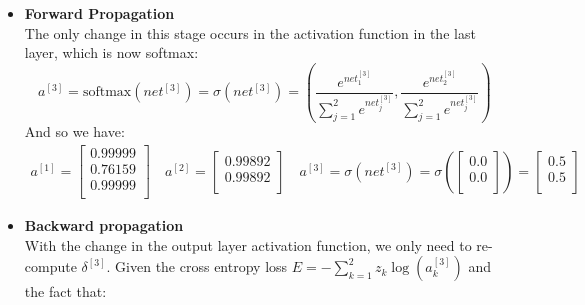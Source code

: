 \documentclass{exam}
\begin{document}
\begin{questions}
            \begin{itemize}
                \item \textbf{Forward Propagation} \\[0.4em]
                The only change in this stage occurs in the activation function in the last layer, which is now softmax:
                \begin{equation*}
                    a^{[3]} = \text{softmax}(net^{[3]}) = \sigma(net^{[3]}) = \left(\frac{e^{net^{[3]}_1}}{\sum_{j = 1}^{2}e^{net^{[3]}_j}},\frac{e^{net^{[3]}_2}}{\sum_{j = 1}^{2}e^{net^{[3]}_j}}\right)
                \end{equation*}  
                And so we have:
                \begin{align*}
                    a^{[1]} = 
                    \begin{bmatrix}
                        0.99999  \\
                        0.76159  \\
                        0.99999  \\
                    \end{bmatrix} \quad 
                    a^{[2]} = 
                    \begin{bmatrix}
                        0.99892  \\
                        0.99892  \\   
                    \end{bmatrix} \quad 
                    a^{[3]} = \sigma(net^{[3]}) = \sigma\left(
                    \begin{bmatrix}
                        0.0  \\
                        0.0  \\
                    \end{bmatrix} \right) =
                    \begin{bmatrix}
                        0.5  \\
                        0.5  \\
                    \end{bmatrix}
                \end{align*}     
                \item \textbf{Backward propagation} \\[0.4em]
                With the change in the output layer activation function, we only need to re-compute $\delta^{[3]}$. Given the cross entropy loss $E = -\sum_{k = 1}^{2} z_k \log(a^{[3]}_k)$ and the fact that:

\end{itemize}
\end{questions}
\end{document}
